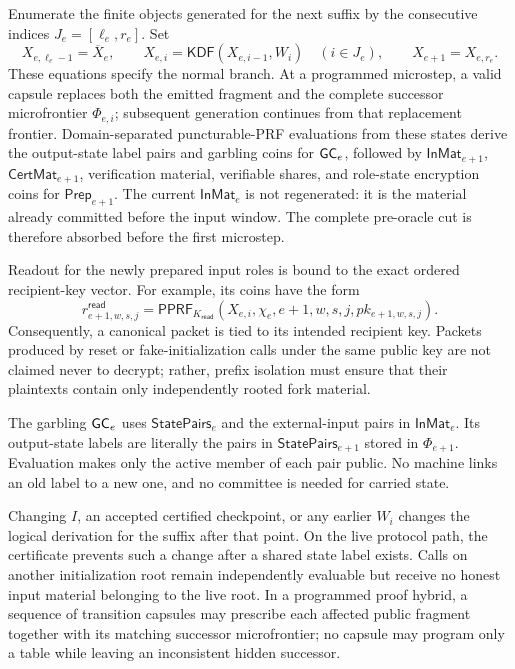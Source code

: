 Enumerate the finite objects generated for the next suffix by the consecutive
indices $J_e=[\ell_e,r_e]$.  Set
\[
  X_{e,\ell_e-1}=\overline X_e,
  \qquad
  X_{e,i}=\mathsf{KDF}(X_{e,i-1},W_i)
  \quad(i\in J_e),
  \qquad
  X_{e+1}=X_{e,r_e}.
  \label{eq:kdf-chain}
\]
These equations specify the normal branch.  At a programmed microstep, a
valid capsule replaces both the emitted fragment and the complete successor
microfrontier $\Phi_{e,i}$; subsequent generation continues from that
replacement frontier.
Domain-separated puncturable-PRF evaluations from these states derive the
output-state label pairs and garbling coins for $\mathsf{GC}_e$, followed by
$\mathsf{InMat}_{e+1}$, $\mathsf{CertMat}_{e+1}$, verification material,
verifiable shares, and role-state encryption coins for
$\mathsf{Prep}_{e+1}$.  The current $\mathsf{InMat}_e$ is not regenerated:
it is the material already committed before the input window.  The complete
pre-oracle cut is therefore absorbed before the first microstep.

Readout for the newly prepared input roles is bound to the exact ordered
recipient-key vector.  For example, its coins have the form
\[
 r^{\mathsf{read}}_{e+1,w,s,j}
 =\mathsf{PPRF}_{K_{\mathsf{read}}}
   (X_{e,i},\chi_e,e+1,w,s,j,
    pk_{e+1,w,s,j}).
  \label{eq:pk-bound-readout}
\]
Consequently, a canonical packet is tied to its intended recipient key.
Packets produced by reset or fake-initialization calls under the same public
key are not claimed never to decrypt; rather, prefix isolation must ensure
that their plaintexts contain only independently rooted fork material.

The garbling $\mathsf{GC}_e$ uses $\mathsf{StatePairs}_e$ and the external-input pairs
in $\mathsf{InMat}_e$.  Its output-state labels are literally the pairs in
$\mathsf{StatePairs}_{e+1}$ stored in $\Phi_{e+1}$.  Evaluation makes only the
active member of each pair public.  No machine links an old label to a new
one, and no committee is needed for carried state.

Changing $I$, an accepted certified checkpoint, or any earlier $W_i$ changes
the logical derivation for the suffix after that point.  On the live protocol
path, the certificate prevents such a change after a shared state label
exists.  Calls on another initialization root remain independently evaluable
but receive no honest input material belonging to the live root.  In a
programmed proof hybrid, a sequence of transition capsules may prescribe each
affected public fragment together with its matching successor microfrontier;
no capsule may program only a table while leaving an inconsistent hidden
successor.

